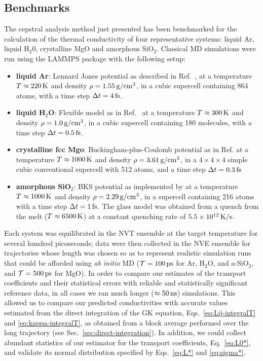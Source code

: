 \subsection{Benchmarks}  \label{sec:cepstral-benchmarks}
The cepstral analysis method just presented has been benchmarked for the calculation of the thermal conductivity of four representative systems: liquid Ar, liquid H$_2$0, crystalline MgO and amorphous SiO$_2$.
Classical MD simulations were run using the \textsc{LAMMPS} package \cite{LAMMPS1995} with the following setup:
\begin{itemize}
    \item \textbf{liquid Ar}: Lennard Jones potential as described in Ref.~\cite{Argon-FF}, at a temperature $T\approx 220\,\mathrm{K}$ and density $\rho=1.55\,\mathrm{g/cm^3}$, in a cubic supercell containing 864 atoms, with a time step $\Delta t=4\,\mathrm{fs}$.
    \item \textbf{liquid H$_2$O}: Flexible model as in Ref.~\cite{Water-FF} at a temperature $T\approx 300\,\mathrm{K}$ and density $\rho=1.0\,\mathrm{g/cm^3}$, in a cubic supercell containing 180 molecules, with a time step $\Delta t=0.5\,\mathrm{fs}$.
    \item \textbf{crystalline fcc Mgo}: Buckingham-plus-Coulomb potential as in Ref.  at a temperature $T\approx 1000\,\mathrm{K}$ and density $\rho=3.61\,\mathrm{g/cm^3}$, in a $4\times 4\times 4$ simple cubic conventional supercell with 512 atoms, and a time step $\Delta t=0.3\,\mathrm{fs}$
    \item \textbf{amorphous SiO$_2$}: BKS potential \cite{Silica-BKS-1990} as implemented by \citet{Silica-BKS-2015} at a temperature $T\approx 1000\,\mathrm{K}$ and density $\rho=2.29\,\mathrm{g/cm^3}$,  in a supercell containing 216 atoms with a time step $\Delta t=1\,\mathrm{fs}$. The glass model was obtained from a quench from the melt ($T\approx 6500\,\mathrm{K}$) at a constant quenching rate of $5.5\times 10^{12}\,\mathrm{K/s}$.
\end{itemize}
Each system was equilibrated in the NVT ensemble at the target temperature for several hundred picoseconds; data were then collected in the NVE ensemble for trajectories whose length was chosen so as to represent realistic simulation runs that could be afforded using \emph{ab initio} MD ($\mathcal{T} = 100\,\mathrm{ps}$ for Ar, H$_2$O, and a-SiO$_2$, and $\mathcal{T} =500\,\mathrm{ps}$ for MgO). 
In order to compare our estimates of the transport coefficients and their statistical errors with reliable and statistically significant reference data, in all cases we ran much longer ($\approx 50\,\mathrm{ns}$) simulations. 
This allowed us to compare our predicted conductivities with accurate values estimated from the direct integration of the GK equation, Eqs.~\eqref{eq:Lij-integralT} and \eqref{eq:kappa-integralT}, as obtained from a block average \cite{Frenkel2001} performed over the long trajectory (see Sec.~\ref{sec:direct-integration}). 
In addition, we could collect abundant statistics of our estimator for the transport coefficients, Eq.~\eqref{eq:L0*}, and validate its normal distribution specified by Eqs.~\eqref{eq:L*} and \eqref{eq:sigma*}. 

